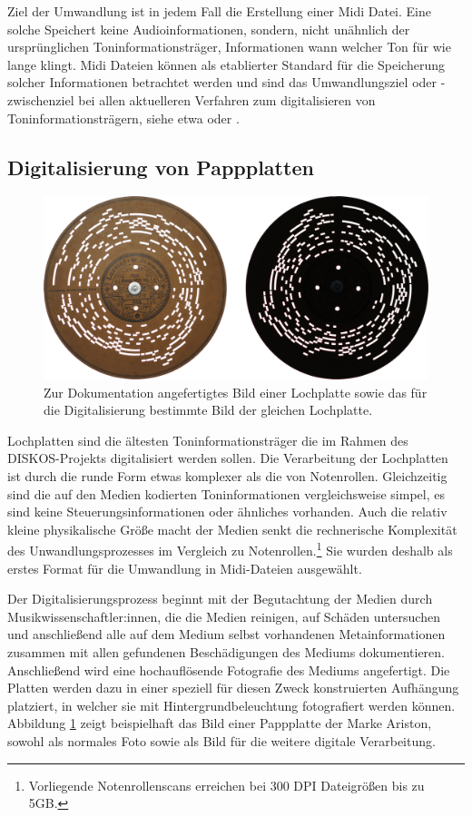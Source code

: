 Ziel der Umwandlung ist in jedem Fall die Erstellung einer Midi Datei.
Eine solche Speichert keine Audioinformationen, sondern, nicht unähnlich der ursprünglichen Toninformationsträger, Informationen wann welcher Ton für wie lange klingt.
Midi Dateien können als etablierter Standard für die Speicherung solcher Informationen betrachtet werden und sind das Umwandlungsziel oder -zwischenziel bei allen aktuelleren Verfahren zum digitalisieren von Toninformationsträgern, siehe etwa \textcite[65]{colmenares_2011} oder \textcite[518]{shi_2019}.


\subsection{Digitalisierung von Pappplatten}

\begin{figure}[t]
    \centering
    \includegraphics[width=\textwidth]{graphics/ariston_pictures.png}
    \caption{Zur Dokumentation angefertigtes Bild einer Lochplatte sowie das für die Digitalisierung bestimmte Bild der gleichen Lochplatte.}
    \label{pappplattenphotos}
\end{figure}

Lochplatten sind die ältesten Toninformationsträger die im Rahmen des DISKOS-Projekts digitalisiert werden sollen.
Die Verarbeitung der Lochplatten ist durch die runde Form etwas komplexer als die von Notenrollen.
Gleichzeitig sind die auf den Medien kodierten Toninformationen vergleichsweise simpel, es sind keine Steuerungsinformationen oder ähnliches vorhanden.
Auch die relativ kleine physikalische Größe macht der Medien senkt die rechnerische Komplexität des Unwandlungsprozesses im Vergleich zu Notenrollen.\footnote{Vorliegende Notenrollenscans erreichen bei 300 DPI Dateigrößen bis zu 5GB.}
Sie wurden deshalb als erstes Format für die Umwandlung in Midi-Dateien ausgewählt.

Der Digitalisierungsprozess beginnt mit der Begutachtung der Medien durch Musikwissenschaftler:innen, die die Medien reinigen, auf Schäden untersuchen und anschließend alle auf dem Medium selbst vorhandenen Metainformationen zusammen mit allen gefundenen Beschädigungen des Mediums dokumentieren.
Anschließend wird eine hochauflösende Fotografie des Mediums angefertigt.
Die Platten werden dazu in einer speziell für diesen Zweck konstruierten Aufhängung platziert, in welcher sie mit Hintergrundbeleuchtung fotografiert werden können.
Abbildung \ref{pappplattenphotos} zeigt beispielhaft das Bild einer Pappplatte der Marke Ariston, sowohl als normales Foto  sowie als Bild für die weitere digitale Verarbeitung.

